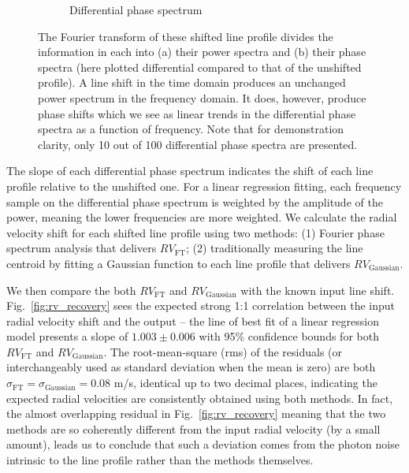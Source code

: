 \begin{figure}[tbp]
\begin{subfigure}[b]{0.49\textwidth}
        \caption{Differential phase spectrum}
        \label{fig:dps}
    \end{subfigure}	
    \caption[Fourier transform of 100 shifted line profiles]
    {The Fourier transform of these shifted line profile divides the information in each into (a) their power spectra and (b) their phase spectra (here plotted differential compared to that of the unshifted profile). A line shift in the time domain produces an unchanged power spectrum in the frequency domain. It does, however, produce phase shifts which we see as linear trends in the differential phase spectra as a function of frequency. Note that for demonstration clarity, only 10 out of 100 differential phase spectra are presented.}
\label{fig:FT_process}
\end{figure}    

The slope of each differential phase spectrum indicates the shift of each line profile relative to the unshifted one. For a linear regression fitting, each frequency sample on the differential phase spectrum is weighted by the amplitude of the power, meaning the lower frequencies are more weighted. We calculate the radial velocity shift for each shifted line profile using two methods: (1) Fourier phase spectrum analysis that delivers $RV_\text{FT}$; (2) traditionally measuring the line centroid by fitting a Gaussian function to each line profile that delivers $RV_\text{Gaussian}$. 

We then compare the both $RV_\text{FT}$ and $RV_\text{Gaussian}$ with the known input line shift. Fig.~\ref{fig:rv_recovery} sees the expected strong 1:1 correlation between the input radial velocity shift and the output -- the line of best fit of a linear regression model presents a slope of $1.003\pm0.006$ with 95\% confidence bounds for both $RV_\text{FT}$ and $RV_\text{Gaussian}$. 
The root-mean-square (rms) of the residuals (or interchangeably used as standard deviation when the mean is zero) are both $\sigma_\text{FT} = \sigma_\text{Gaussian} = 0.08$ m/s, identical up to two decimal places, indicating the expected radial velocities are consistently obtained using both methods. In fact, the almost overlapping residual in Fig.~\ref{fig:rv_recovery} meaning that the two methods are so coherently different from the input radial velocity (by a small amount), leads us to conclude that such a deviation comes from the photon noise intrinsic to the line profile rather than the methods themselves. 

